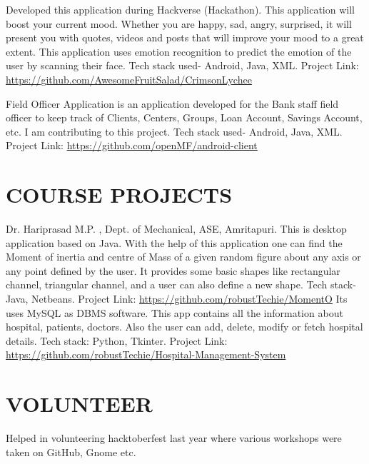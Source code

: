 \documentclass[11pt,a4paper,sans]{moderncv}        %
\begin{document}
{Developed this application during Hackverse (Hackathon). This application will boost your current mood. Whether you are happy, sad, angry, surprised, it will present you with quotes, videos and posts that will improve your mood to a great extent. This application uses emotion recognition to predict the emotion of the user by scanning their face. Tech stack used- Android, Java, XML. Project Link: {\newline}
\url{https://github.com/AwesomeFruitSalad/CrimsonLychee}}{}

{Field Officer Application is an application developed for the Bank staff field officer to keep track of Clients, Centers, Groups, Loan Account, Savings Account, etc. I am contributing to this project. Tech stack used- Android, Java, XML. Project Link: {\newline} 
\url{https://github.com/openMF/android-client}}{}  %

\section{COURSE PROJECTS}
{Dr. Hariprasad M.P. , Dept. of Mechanical, ASE, Amritapuri.{\newline}
This is desktop application based on Java. With the help of this application one can find the Moment of inertia and centre of Mass of a given random figure about any axis or any point defined by the user. It provides some basic shapes like rectangular channel, triangular channel, and a user can also define a new shape. Tech stack- Java, Netbeans. Project Link: {\newline}
\url{https://github.com/robustTechie/MomentO}}{}
{Its uses MySQL as DBMS software. This app contains all the information about hospital, patients, doctors. Also the user can add, delete, modify or fetch hospital details. Tech stack: Python, Tkinter. Project Link:   {\newline}
\url{https://github.com/robustTechie/Hospital-Management-System}}{}

\section{VOLUNTEER}
{Helped in volunteering  hacktoberfest last year where various workshops were taken on GitHub, Gnome etc. }
\end{document}
